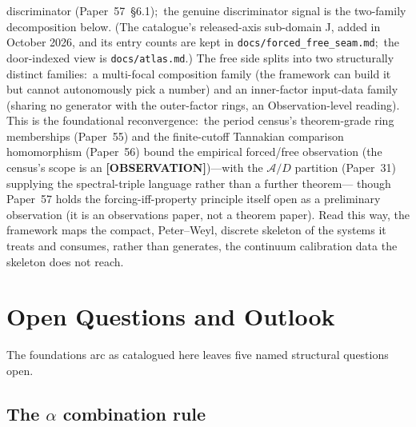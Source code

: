 \documentclass[aps,pra,twocolumn,superscriptaddress,longbibliography]{revtex4-2}
\begin{document}
discriminator (Paper~57~\S6.1);\ the genuine discriminator signal is
the two-family decomposition below.  (The catalogue's released-axis
sub-domain J, added in October 2026, and its entry counts are kept in
\texttt{docs/forced\_free\_seam.md};\ the door-indexed view is
\texttt{docs/atlas.md}.)  The free side splits into two structurally
distinct families:\ a multi-focal composition family (the framework can
build it but cannot autonomously pick a number) and an inner-factor
input-data family (sharing no generator with the outer-factor rings,
an Observation-level reading).  This is the foundational reconvergence:\ the
period census's theorem-grade ring memberships (Paper~55) and
the finite-cutoff Tannakian comparison homomorphism (Paper~56) bound
the empirical forced/free observation (the census's scope is an
\textbf{[OBSERVATION]})---with the $\mathcal{A}/D$ partition (Paper~31) supplying the
spectral-triple language rather than a further theorem---
though Paper~57 holds the forcing-iff-property principle itself open as
a preliminary observation (it is an observations paper, not a theorem
paper).  Read this
way, the framework maps the compact,
Peter--Weyl, discrete skeleton of the systems it treats and consumes, rather than generates, the continuum calibration
data the skeleton does not reach.

\section{Open Questions and Outlook}
\label{sec:open}

The foundations arc as catalogued here leaves five named structural
questions open.

\subsection*{The $\alpha$ combination rule}
\end{document}
